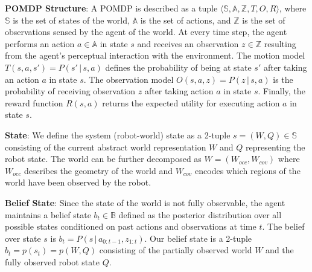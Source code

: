 \documentclass{article}
\newcommand{\ph}[1]{{\textbf{#1}:}} %
\begin{document}
\ph{POMDP Structure} A POMDP is described as a tuple $\langle \mathbb{S}, \mathbb{A}, \mathbb{Z}, T, O, R \rangle$, where $\mathbb{S}$ is the set of states of the world, $\mathbb{A}$ is the set of actions, and $\mathbb{Z}$ is the set of observations sensed by the agent of the world. At every time step, the agent performs an action $a \in \mathbb{A}$ in state $s$ and receives an observation $z \in \mathbb{Z}$ resulting from the agent's perceptual interaction with the environment. The motion model $T(s, a, s') = P(s'\,|\,s, a)$ defines the probability of being at state $s'$ after taking an action $a$ in state $s$. The observation model $O(s, a, z) = P(z\,|\,s, a)$ is the probability of receiving observation $z$ after taking action $a$ in state $s$. Finally, the reward function $R(s,a)$ returns the expected utility for executing action $a$ in state $s$.

\ph{State} We define the system (robot-world) state as a 2-tuple $s = (W, Q) \in \mathbb{S}$ consisting of the current abstract world representation $W$ and $Q$ representing the robot state. The world can be further decomposed as $W = (W_{occ}, W_{cov})$ where $W_{occ}$ describes the geometry of the world and $W_{cov}$ encodes which regions of the world have been observed by the robot.   

\ph{Belief State} Since the state of the world is not fully observable, the agent maintains a belief state $b_t\in \mathbb{B}$ defined as the posterior distribution over all possible states conditioned on past actions and observations at time $t$. The belief over state $s$ is $b_{t} = P(s \,|\, a_{0:t-1}, z_{1:t})$. Our belief state is a 2-tuple $b_t = p(s_t) = p(W,Q)$ consisting of the partially observed world $W$ and the fully observed robot state $Q$.


\end{document}
